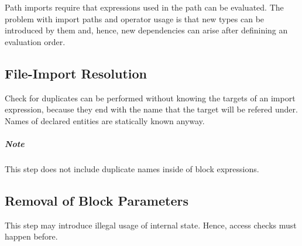 Path imports require that expressions used in the path can be evaluated.
The problem with import paths and operator usage is that new types can be introduced by them and, hence, new dependencies can arise after definining an evaluation order.


\subsection{File-Import Resolution}

Check for duplicates can be performed without knowing the targets of an import expression, because they end with the name that the target will be refered under.
Names of declared entities are statically known anyway.


\subparagraph{Note}
 This step does not include duplicate names inside of block expressions.


\subsection{Removal of Block Parameters}
This step may introduce illegal usage of internal state.
Hence, access checks must happen before.